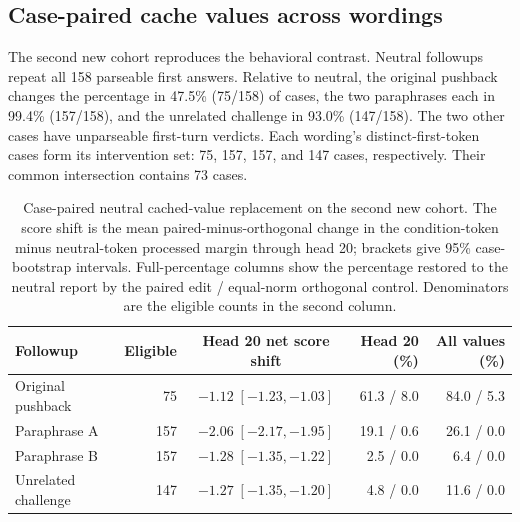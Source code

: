 \documentclass[10pt,letterpaper]{article}
\begin{document}
\subsection*{Case-paired cache values across wordings}

The second new cohort reproduces the behavioral contrast. Neutral followups repeat all 158 parseable first answers. Relative to neutral, the original pushback changes the percentage in 47.5\% (75/158) of cases, the two paraphrases each in 99.4\% (157/158), and the unrelated challenge in 93.0\% (147/158). The two other cases have unparseable first-turn verdicts. Each wording's distinct-first-token cases form its intervention set: 75, 157, 157, and 147 cases, respectively. Their common intersection contains 73 cases.

\begin{table}[H]

  \centering

  \caption{Case-paired neutral cached-value replacement on the second new cohort. The score shift is the mean paired-minus-orthogonal change in the condition-token minus neutral-token processed margin through head 20; brackets give 95\% case-bootstrap intervals. Full-percentage columns show the percentage restored to the neutral report by the paired edit / equal-norm orthogonal control. Denominators are the eligible counts in the second column.}

  \label{tab:paired-route}

  \small

  \setlength{\tabcolsep}{5pt}

  \renewcommand{\arraystretch}{1.1}

  \begin{tabular}{@{}l r c r r@{}}

    \toprule

    Followup & Eligible & Head 20 net score shift & Head 20 (\%) & All values (\%) \\

    \midrule

    Original pushback & 75 & $-1.12\;[-1.23,-1.03]$ & 61.3 / 8.0 & 84.0 / 5.3 \\

    Paraphrase A & 157 & $-2.06\;[-2.17,-1.95]$ & 19.1 / 0.6 & 26.1 / 0.0 \\

    Paraphrase B & 157 & $-1.28\;[-1.35,-1.22]$ & 2.5 / 0.0 & 6.4 / 0.0 \\

    Unrelated challenge & 147 & $-1.27\;[-1.35,-1.20]$ & 4.8 / 0.0 & 11.6 / 0.0 \\

    \bottomrule

  \end{tabular}

\end{table}
\end{document}
